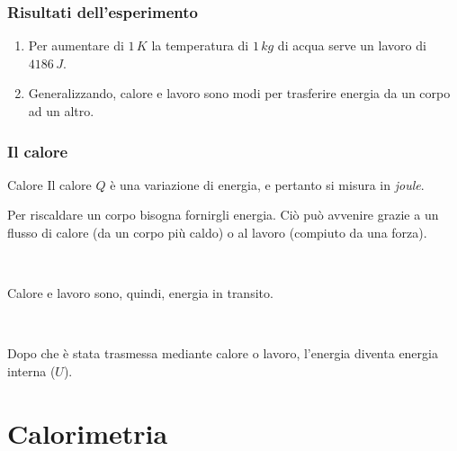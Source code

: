 \documentclass[]{beamer}
\theoremstyle{plain}
\begin{document}
\begin{frame}
\frametitle{Risultati dell'esperimento}
\begin{enumerate}
  \item Per aumentare di $ 1 \, K $ la temperatura di $ 1 \, kg $ di acqua serve un lavoro di $ 4186 \, J $.\pause
  \item Generalizzando, \alert{calore e lavoro sono modi per trasferire energia da un corpo ad un altro}.
\end{enumerate}

\begin{figure}
\end{figure}
\end{frame}


\begin{frame}
\frametitle{Il calore}
\begin{block}{Calore}
Il calore $ Q $ è una variazione di energia, e pertanto si misura in \emph{joule}.
\end{block}\pause

Per riscaldare un corpo bisogna fornirgli energia. Ciò può avvenire grazie a un flusso di calore (da un corpo più caldo) o al lavoro (compiuto da una forza).\pause

~

Calore e lavoro sono, quindi, \alert{energia in transito}.\pause

~

Dopo che è stata trasmessa mediante calore o lavoro, l’energia
diventa \alert{energia interna} ($ U $).

\end{frame}

\section{Calorimetria}
\end{document}
